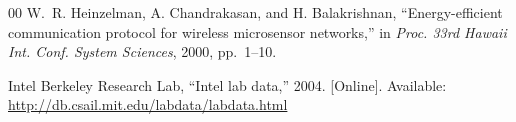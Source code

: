 \documentclass[conference]{IEEEtran}
\begin{document}
\begin{thebibliography}{00}
W.~R. Heinzelman, A. Chandrakasan, and H. Balakrishnan, ``Energy-efficient communication protocol for wireless microsensor networks,'' in \textit{Proc. 33rd Hawaii Int. Conf. System Sciences}, 2000, pp.~1--10.

Intel Berkeley Research Lab, ``Intel lab data,'' 2004. [Online]. Available: \url{http://db.csail.mit.edu/labdata/labdata.html}

\end{thebibliography}
\end{document}
